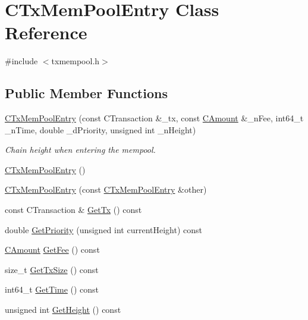 \hypertarget{class_c_tx_mem_pool_entry}{}\section{C\+Tx\+Mem\+Pool\+Entry Class Reference}
\label{class_c_tx_mem_pool_entry}


{\ttfamily \#include $<$txmempool.\+h$>$}

\subsection*{Public Member Functions}
\begin{DoxyCompactItemize}
\item 
\hyperlink{class_c_tx_mem_pool_entry_a2ceb48d4c37f0308e97f57e237b50a67}{C\+Tx\+Mem\+Pool\+Entry} (const C\+Transaction \&\+\_\+tx, const \hyperlink{amount_8h_a4eaf3a5239714d8c45b851527f7cb564}{C\+Amount} \&\+\_\+n\+Fee, int64\+\_\+t \+\_\+n\+Time, double \+\_\+d\+Priority, unsigned int \+\_\+n\+Height)
\begin{DoxyCompactList}\small\item\em Chain height when entering the mempool. \end{DoxyCompactList}\item 
\hyperlink{class_c_tx_mem_pool_entry_a4a22f1c696136f99f5c296c90cf0406a}{C\+Tx\+Mem\+Pool\+Entry} ()
\item 
\hyperlink{class_c_tx_mem_pool_entry_ad62eaba6adc7ec36487ae690b5b93148}{C\+Tx\+Mem\+Pool\+Entry} (const \hyperlink{class_c_tx_mem_pool_entry}{C\+Tx\+Mem\+Pool\+Entry} \&other)
\item 
const C\+Transaction \& \hyperlink{class_c_tx_mem_pool_entry_a59f51f38161c191dae2614c53ed40fb2}{Get\+Tx} () const 
\item 
double \hyperlink{class_c_tx_mem_pool_entry_aa419a2eb4c9f1097e6e692bb8e60ebde}{Get\+Priority} (unsigned int current\+Height) const 
\item 
\hyperlink{amount_8h_a4eaf3a5239714d8c45b851527f7cb564}{C\+Amount} \hyperlink{class_c_tx_mem_pool_entry_a313b0505c1df8796713e807508ebe456}{Get\+Fee} () const 
\item 
size\+\_\+t \hyperlink{class_c_tx_mem_pool_entry_a500fcb2039ceb24798d8ddb7d548b7b5}{Get\+Tx\+Size} () const 
\item 
int64\+\_\+t \hyperlink{class_c_tx_mem_pool_entry_a249b1f68b5b06bf8ec8fcbb5bef61090}{Get\+Time} () const 
\item 
unsigned int \hyperlink{class_c_tx_mem_pool_entry_ac519a06da6ba8f9358d4301c5cac4ac9}{Get\+Height} () const 
\end{DoxyCompactItemize}


